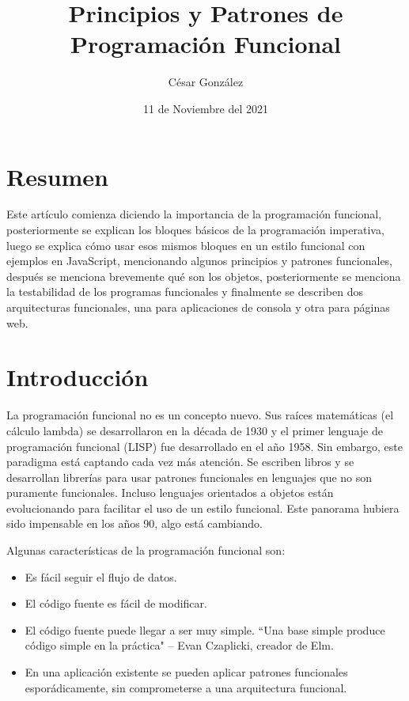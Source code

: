 \documentclass{article}
\begin{document}
\title{\Large{\textbf{Principios y Patrones de Programación Funcional}}}
\author{César González}
\date{11 de Noviembre del 2021}
\maketitle


\pagebreak
\section*{Resumen}
Este artículo comienza diciendo la importancia de la programación funcional, posteriormente se explican los bloques básicos de la programación imperativa, luego se explica cómo usar esos mismos bloques en un estilo funcional con ejemplos en JavaScript, mencionando algunos principios y patrones funcionales, después se menciona brevemente qué son los objetos, posteriormente se menciona la testabilidad de los programas funcionales y finalmente se describen dos arquitecturas funcionales, una para aplicaciones de consola y otra para páginas web.


\section*{Introducción}
La programación funcional no es un concepto nuevo. Sus raíces matemáticas (el cálculo lambda) se desarrollaron en la década de 1930 y el primer lenguaje de programación funcional (LISP) fue desarrollado en el año 1958. Sin embargo, este paradigma está captando cada vez más atención. Se escriben libros y se desarrollan librerías para usar patrones funcionales en lenguajes que no son puramente funcionales. Incluso lenguajes orientados a objetos están evolucionando para facilitar el uso de un estilo funcional. Este panorama hubiera sido impensable en los años 90, algo está cambiando.\cite{why-isnt-fp-norm}

Algunas características de la programación funcional son:
\begin{itemize}
  \item Es fácil seguir el flujo de datos.
  \item El código fuente es fácil de modificar.
  \item El código fuente puede llegar a ser muy simple. ``Una base simple produce código simple en la práctica" – Evan Czaplicki, creador de Elm.\cite{mainstream-elm}
  \item En una aplicación existente se pueden aplicar patrones funcionales esporádicamente, sin comprometerse a una arquitectura funcional.\cite{skeptics-functional-style}
\end{itemize}
\end{document}
